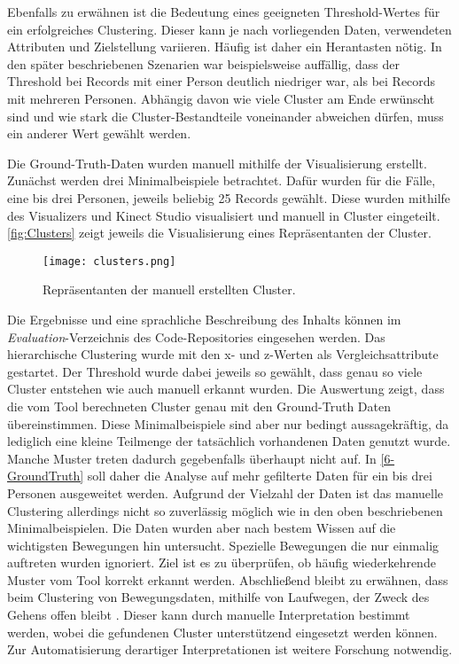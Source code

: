 Ebenfalls zu erwähnen ist die Bedeutung eines geeigneten Threshold-Wertes für ein erfolgreiches Clustering.
Dieser kann je nach vorliegenden Daten, verwendeten Attributen und Zielstellung variieren.
Häufig ist daher ein {\glqq Herantasten\grqq} nötig.
In den später beschriebenen Szenarien war beispielsweise auffällig,
dass der Threshold bei Records mit einer Person deutlich niedriger war,
als bei Records mit mehreren Personen.
Abhängig davon wie viele Cluster am Ende erwünscht sind
und wie stark die Cluster-Bestandteile voneinander abweichen dürfen,
muss ein anderer Wert gewählt werden.

Die Ground-Truth-Daten wurden manuell mithilfe der Visualisierung erstellt.
Zunächst werden drei Minimalbeispiele betrachtet.
Dafür wurden für die Fälle, eine bis drei Personen, jeweils beliebig 25 Records gewählt.
Diese wurden mithilfe des Visualizers und Kinect Studio visualisiert und manuell in Cluster eingeteilt.
\autoref{fig:Clusters} zeigt jeweils die Visualisierung eines Repräsentanten der Cluster.
\begin{figure}[ht]
    \begin{center}
    \texttt{[image: clusters.png]}
    \end{center}
    \caption{Repräsentanten der manuell erstellten Cluster.}
    \label{fig:Clusters}
\end{figure}
Die Ergebnisse und eine sprachliche Beschreibung des Inhalts
können im \emph{Evaluation}-Verzeichnis des Code-Repositories eingesehen werden.
Das hierarchische Clustering wurde mit den x- und z-Werten als Vergleichsattribute gestartet.
Der Threshold wurde dabei jeweils so gewählt,
dass genau so viele Cluster entstehen wie auch manuell erkannt wurden.
Die Auswertung zeigt, dass die vom Tool berechneten Cluster genau mit den Ground-Truth Daten übereinstimmen.
Diese Minimalbeispiele sind aber nur bedingt aussagekräftig,
da lediglich eine kleine Teilmenge der tatsächlich vorhandenen Daten genutzt wurde.
Manche Muster treten dadurch gegebenfalls überhaupt nicht auf.
In \autoref{6-GroundTruth} soll daher die Analyse auf mehr gefilterte Daten
für ein bis drei Personen ausgeweitet werden.
Aufgrund der Vielzahl der Daten ist das manuelle Clustering allerdings nicht so
zuverlässig möglich wie in den oben beschriebenen Minimalbeispielen.
Die Daten wurden aber nach bestem Wissen auf die wichtigsten Bewegungen hin untersucht.
Spezielle Bewegungen die nur einmalig auftreten wurden ignoriert.
Ziel ist es zu überprüfen,
ob häufig wiederkehrende Muster vom Tool korrekt erkannt werden.
Abschließend bleibt zu erwähnen,
dass beim Clustering von Bewegungsdaten, mithilfe von Laufwegen,
der Zweck des Gehens offen bleibt \citep{monastero_traces_2018}.
Dieser kann durch manuelle Interpretation bestimmt werden,
wobei die gefundenen Cluster unterstützend eingesetzt werden können.
Zur Automatisierung derartiger Interpretationen ist weitere Forschung notwendig. 

